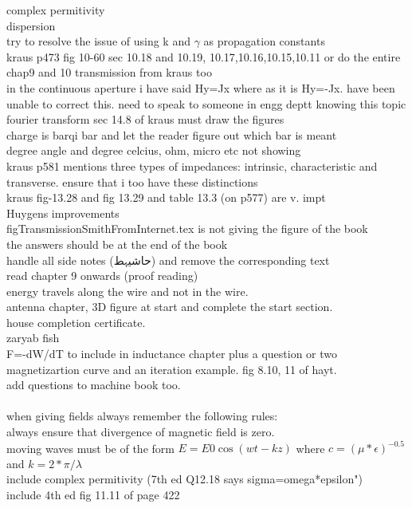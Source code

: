 \begin{otherlanguage}{english}
complex permitivity\\
dispersion\\
try to resolve the issue of using k and $\gamma$ as propagation constants\\
kraus p473 fig 10-60 sec 10.18 and 10.19, 10.17,10.16,10.15,10.11 or do the entire chap9 and 10  transmission from kraus too\\
in the continuous aperture i have said Hy=Jx where as it is Hy=-Jx. have been unable to correct this. need to speak to someone in engg deptt knowing this topic\\
fourier transform sec 14.8 of kraus must draw the figures\\
charge is barqi bar and let the reader figure out which bar is meant\\
degree angle and degree celcius, ohm, micro etc not showing\\
kraus p581 mentions three types of impedances: intrinsic, characteristic and transverse. ensure that i too have these distinctions\\
kraus fig-13.28 and fig 13.29 and table 13.3 (on p577) are v. impt\\
Huygens improvements\\
figTransmissionSmithFromInternet.tex is not giving the figure of the book\\
the answers should be at the end of the book\\
handle all side notes (حاشیہط) and remove the corresponding text\\
read chapter 9 onwards (proof reading)\\
energy travels along the wire and not in the wire.\\
antenna chapter, 3D figure at start and complete the start section.\\
house completion certificate.\\
zaryab fish\\
F=-dW/dT to include in inductance chapter plus a question or two\\
magnetizartion curve and an iteration example. fig 8.10, 11 of hayt.\\
add questions to machine book too.\\
\\
when giving fields always remember the following rules:\\
always ensure that divergence of magnetic field is zero.\\
moving waves must be of the form $E=E0 \cos(wt-kz)$ where $c=(\mu*\epsilon)^{-0.5}$ and $k=2*\pi/\lambda$\\
include complex permitivity  (7th ed Q12.18 says sigma=omega*epsilon")\\
include 4th ed fig 11.11 of page 422
\end{otherlanguage}
